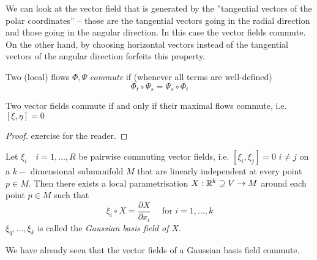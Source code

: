 \begin{example}
	
	We can look at the vector field that is generated by the ''tangential vectors of the polar coordinates'' -- those are the tangential vectors going in the radial direction and those going in the angular direction. In this case the vector fields commute. On the other hand, by choosing horizontal vectors instead of the tangential vectors of the angular direction forfeits this property.  
	
\end{example}

\begin{definition}
	
	Two (local) flows $ \Phi,\Psi $ \emph{commute} if (whenever all terms are well-defined) 
		\[ \Phi_t \circ \Psi_s = \Psi_s \circ \Phi_t \]
	
\end{definition}

\begin{theorem}
	
	Two vector fields commute if and only if their maximal flows commute, i.e. $ [\xi,\eta] = 0 $	
	
\end{theorem}

\begin{proof}
exercise for the reader.
\end{proof}

\begin{theorem, definition}
	
	Let $ \xi_i \quad i = 1, \dots, R $ be pairwise commuting vector fields, i.e. $ [\xi_i,\xi_j]= 0 $  $ i \neq j $ on a $ k- $ dimensional submanifold $ M $ that are linearly independent at every point $ p \in M $. Then there exists a local parametrisation $ X : \mathbb R^k \supseteq V \rightarrow M $ around each point $ p \in M $ such that 
		\[ \xi_i \circ X = \dfrac{\partial X}{\partial x_i}\quad \text{ for } i = 1, \dots, k \]
	$ \xi_q, \dots, \xi_k $ is called the \emph{Gaussian basis field of $ X $}.
	
\end{theorem, definition}

\begin{remark}
	
	We have already seen that the vector fields of a Gaussian basis field commute.
	
\end{remark}

